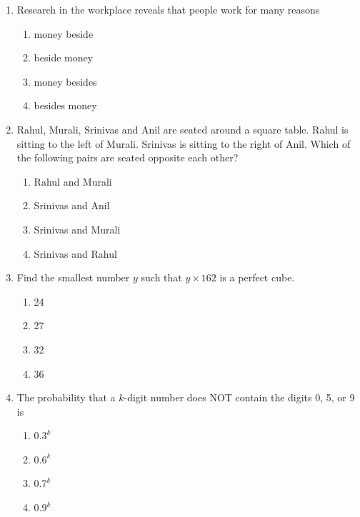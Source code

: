 \documentclass[journal,12pt,onecolumn]{IEEEtran}
\theoremstyle{remark}
\begin{document}
\begin{enumerate}
\item Research in the workplace reveals that people work for many reasons
\begin{multicols}{2}
\begin{enumerate}
\item money beside  
\item beside money  
\item money besides  
\item besides money  
\end{enumerate}
\end{multicols}


\item Rahul, Murali, Srinivas and Anil are seated around a square table.  
Rahul is sitting to the left of Murali. Srinivas is sitting to the right of Anil.  
Which of the following pairs are seated opposite each other?
\begin{multicols}{2}
\begin{enumerate}
\item Rahul and Murali  
\item Srinivas and Anil  
\item Srinivas and Murali  
\item Srinivas and Rahul  
\end{enumerate}
\end{multicols}


\item Find the smallest number $y$ such that $y \times 162$ is a perfect cube.
\begin{multicols}{2}
\begin{enumerate}
\item 24  
\item 27  
\item 32  
\item 36  
\end{enumerate}
\end{multicols}


\item The probability that a $k$-digit number does NOT contain the digits 0, 5, or 9 is
\begin{multicols}{2}
\begin{enumerate}
\item $0.3^k$  
\item $0.6^k$  
\item $0.7^k$  
\item $0.9^k$  
\end{enumerate}
\end{multicols}



\end{enumerate}
\end{document}
